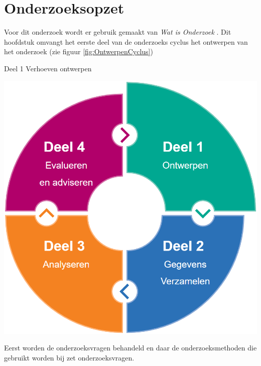 \chapter{Onderzoeksopzet}
Voor dit onderzoek wordt er gebruik gemaakt van \textit{Wat is Onderzoek} \Parencite{Verhoeven}.
Dit hoofdstuk omvangt het eerste deel van de onderzoeks cyclus het ontwerpen van het onderzoek (zie figuur \ref{fig:OntwerpenCyclus})

\begin{graphic}
	\vspace{0.2cm}
	\captionsetup{type=figure}
	\caption{Deel 1 Verhoeven ontwerpen}
	\includegraphics[scale=0.3]{img/OntwerpenCyclus.png}
	\label{fig:OntwerpenCyclus}
	\vspace{0.2cm}
\end{graphic}

\whitespace
Eerst worden de onderzoeksvragen behandeld en daar de onderzoeksmethoden die gebruikt worden bij zet onderzoeksvragen.

\newpage

\newpage


